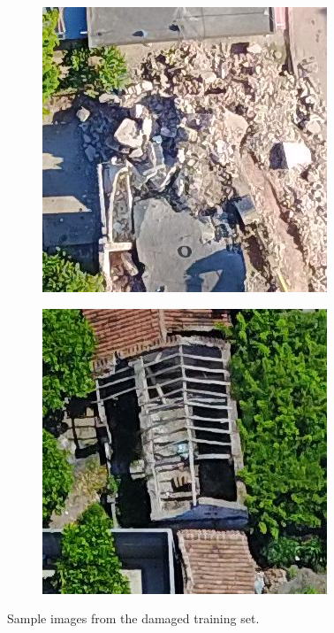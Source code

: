 \begin{figure}[!h]
\begin{subfigure}{.24\textwidth}
    \end{subfigure}
    \begin{subfigure}{.24\textwidth}
        \includegraphics[width=\textwidth]{images/damaged7.jpg}
    \end{subfigure}
    \begin{subfigure}{.24\textwidth}
        \includegraphics[width=\textwidth]{images/damaged8.jpg}
    \end{subfigure}
  \caption{Sample images from the damaged training set.}
  \label{fig:damaged}
\end{figure}


